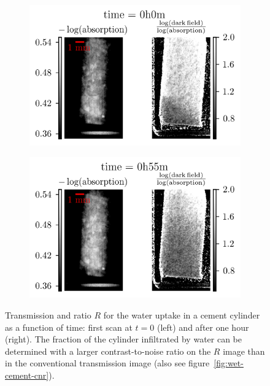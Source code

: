 \begin{figure}[htb]
    \centering
    \begin{subfigure}[b]{.8\textwidth}
    \centering
    \includegraphics[width=\textwidth]{gfx/wet-cement/0.png}
    \caption{}
    \label{fig:wet-cement-0}
    \end{subfigure}
    \hfill
    \begin{subfigure}[b]{.8\textwidth}
    \centering
    \includegraphics[width=\textwidth]{gfx/wet-cement/200.png}
    \caption{}
    \label{fig:wet-cement-200}
    \end{subfigure}
    \caption[Water uptake in cement.]{Transmission and ratio $R$ for the
    water uptake in a cement cylinder as a function of time: first scan at
$t=0$ (left) and after one hour (right). The fraction of the cylinder
infiltrated by water can be determined with a larger contrast-to-noise ratio
on the $R$ image than in the conventional transmission image (also see
figure~\ref{fig:wet-cement-cnr}).}
\label{fig:wet-cement}
\end{figure}

